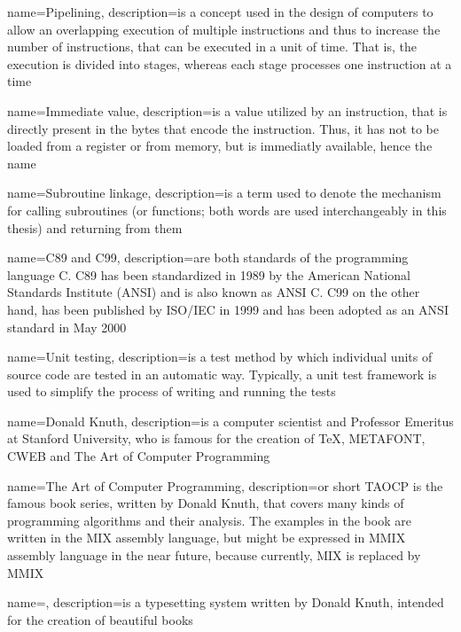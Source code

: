 {
	name={Pipelining},
	description={is a concept used in the design of computers to allow an overlapping execution of multiple instructions and thus to increase the number of instructions, that can be executed in a unit of time. That is, the execution is divided into stages, whereas each stage processes one instruction at a time \citep{glpipe}}
}

{
	name={Immediate value},
	description={is a value utilized by an instruction, that is directly present in the bytes that encode the instruction. Thus, it has not to be loaded from a register or from memory, but is immediatly available, hence the name}
}

{
	name={Subroutine linkage},
	description={is a term used to denote the mechanism for calling subroutines (or functions; both words are used interchangeably in this thesis) and returning from them}
}

{
	name={C89 and C99},
	description={are both standards of the programming language C. C89 has been standardized in 1989 by the American National Standards Institute (ANSI) and is also known as ANSI C. \citep{glc89} C99 on the other hand, has been published by ISO/IEC in 1999 and has been adopted as an ANSI standard in May 2000 \citep{glc99}}
}

{
	name={Unit testing},
	description={is a test method by which individual units of source code are tested in an automatic way. \citep{glunit} Typically, a unit test framework is used to simplify the process of writing and running the tests}
}

{
	name={Donald Knuth},
	description={is a computer scientist and Professor Emeritus at Stanford University, who is famous for the creation of \gls{TeX}, METAFONT, CWEB and \gls{The Art of Computer Programming} \citep{gldonknuth}}
}

{
	name={The Art of Computer Programming},
	description={or short TAOCP is the famous book series, written by \gls{Donald Knuth}, that covers many kinds of programming algorithms and their analysis. The examples in the book are written in the MIX assembly language, but might be expressed in MMIX assembly language in the near future, because currently, MIX is replaced by MMIX \citep{gltaocp}}
}

{
	name={\protect{\TeX}},
	description={is a typesetting system written by \gls{Donald Knuth}, intended for the creation of beautiful books \citep{gltex}}
}

